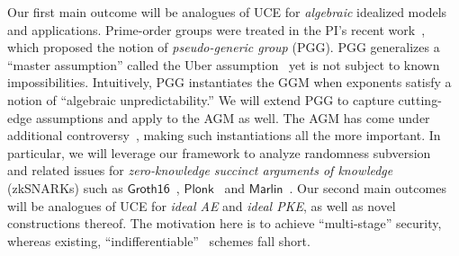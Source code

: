 \iffalse Our first main outcome will be analogues of UCE for \emph{algebraic} idealized models and applications. Prime-order groups were treated  in the PI's recent work~\cite{TCC:BFHO22}, which proposed the notion of \emph{pseudo-generic group} (PGG).  PGG  generalizes  a ``master assumption'' called the Uber assumption~\cite{EC:BonBoyGoh05,PAIRING:Boyen08} yet is  not subject to known impossibilities. Intuitively, PGG  instantiates the GGM when exponents satisfy a notion of  ``algebraic unpredictability.'' 
We will extend PGG to capture  cutting-edge assumptions and apply to the AGM as well. The AGM has come under additional controversy~\cite{AC:ZhaZhoKat22,C:Zhandry22b}, making such instantiations all the more important. In particular, we will leverage our framework to analyze randomness subversion~\cite{AC:BelFucSca16} and related issues for  \emph{zero-knowledge succinct arguments of knowledge} (zkSNARKs) such as $\mathsf{Groth16}$~\cite{EC:Groth16}, $\mathsf{Plonk}$~\cite{EPRINT:GabWilCio19} and $\mathsf{Marlin}$~\cite{EC:CHMMVW20}.   %
Our second main outcomes will be analogues of UCE for \emph{ideal AE} and \emph{ideal PKE}, as well as novel constructions thereof. The motivation here is to achieve  ``multi-stage'' security, whereas existing, ``indifferentiable''~\cite{TCC:MauRenHol04} schemes fall short. %
